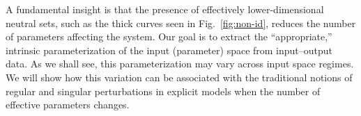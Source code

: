 A fundamental insight is that the presence of effectively
lower-dimensional neutral sets, such as the thick curves seen in
Fig.~\ref{fig:non-id}, reduces the number of parameters affecting the
system.  Our goal is to extract the ``appropriate,'' intrinsic
parameterization of the input (parameter) space from input--output
data.  As we shall see, this parameterization may vary across input
space regimes.  We will show how this variation can be associated with
the traditional notions of regular and singular perturbations in
explicit models when the number of effective parameters changes.























